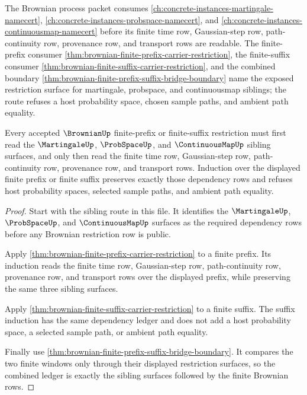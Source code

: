 The Brownian process packet consumes \autoref{ch:concrete-instances-martingale-namecert}, \autoref{ch:concrete-instances-probspace-namecert}, and \autoref{ch:concrete-instances-continuousmap-namecert} before its finite time row, Gaussian-step row, path-continuity row, provenance row, and transport rows are readable. The finite-prefix consumer \autoref{thm:brownian-finite-prefix-carrier-restriction}, the finite-suffix consumer \autoref{thm:brownian-finite-suffix-carrier-restriction}, and the combined boundary \autoref{thm:brownian-finite-prefix-suffix-bridge-boundary} name the exposed restriction surface for martingale, probspace, and continuousmap siblings; the route refuses a host probability space, chosen sample paths, and ambient path equality.

\begin{theorem}
\label{thm:brownian-finite-prefix-suffix-dependency-ledger}
Every accepted $\BrownianUp$ finite-prefix or finite-suffix restriction must first read the $\MartingaleUp$, $\ProbSpaceUp$, and $\ContinuousMapUp$ sibling surfaces, and only then read the finite time row, Gaussian-step row, path-continuity row, provenance row, and transport rows. Induction over the displayed finite prefix or finite suffix preserves exactly those dependency rows and refuses host probability spaces, selected sample paths, and ambient path equality.
\end{theorem}
\begin{proof}
Start with the sibling route in this file. It identifies the $\MartingaleUp$, $\ProbSpaceUp$, and $\ContinuousMapUp$ surfaces as the required dependency rows before any Brownian restriction row is public.

Apply \autoref{thm:brownian-finite-prefix-carrier-restriction} to a finite prefix. Its induction reads the finite time row, Gaussian-step row, path-continuity row, provenance row, and transport rows over the displayed prefix, while preserving the same three sibling surfaces.

Apply \autoref{thm:brownian-finite-suffix-carrier-restriction} to a finite suffix. The suffix induction has the same dependency ledger and does not add a host probability space, a selected sample path, or ambient path equality.

Finally use \autoref{thm:brownian-finite-prefix-suffix-bridge-boundary}. It compares the two finite windows only through their displayed restriction surfaces, so the combined ledger is exactly the sibling surfaces followed by the finite Brownian rows.
\end{proof}
